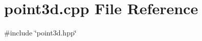 \section{point3d.\+cpp File Reference}
\label{point3d_8cpp}
{\ttfamily \#include \char`\"{}point3d.\+hpp\char`\"{}}\newline

